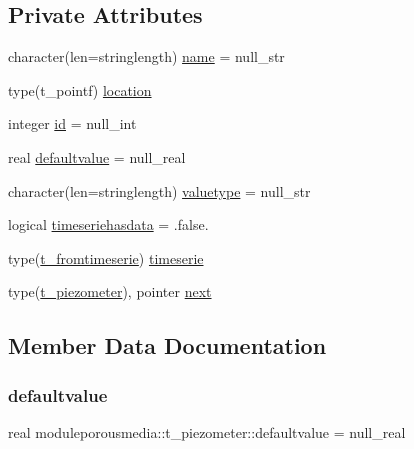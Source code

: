 \subsection*{Private Attributes}
\begin{DoxyCompactItemize}
\item 
character(len=stringlength) \mbox{\hyperlink{structmoduleporousmedia_1_1t__piezometer_a9a875705fadb629f66124c3027d6d73f}{name}} = null\+\_\+str
\item 
type(t\+\_\+pointf) \mbox{\hyperlink{structmoduleporousmedia_1_1t__piezometer_a5ab1e993966e08eebce61931d362c9f5}{location}}
\item 
integer \mbox{\hyperlink{structmoduleporousmedia_1_1t__piezometer_a02df2d8e5985d5684201e8e7e55e32ed}{id}} = null\+\_\+int
\item 
real \mbox{\hyperlink{structmoduleporousmedia_1_1t__piezometer_ae0cc8ffd35dee5988c4b6c575231bb96}{defaultvalue}} = null\+\_\+real
\item 
character(len=stringlength) \mbox{\hyperlink{structmoduleporousmedia_1_1t__piezometer_a5e0c9f72420bddde4b5d641958601ac3}{valuetype}} = null\+\_\+str
\item 
logical \mbox{\hyperlink{structmoduleporousmedia_1_1t__piezometer_a6d812a75d8ae107c0138c147b5183815}{timeseriehasdata}} = .false.
\item 
type(\mbox{\hyperlink{structmoduleporousmedia_1_1t__fromtimeserie}{t\+\_\+fromtimeserie}}) \mbox{\hyperlink{structmoduleporousmedia_1_1t__piezometer_ac183af6102cf7fee5a4625e7dc0865de}{timeserie}}
\item 
type(\mbox{\hyperlink{structmoduleporousmedia_1_1t__piezometer}{t\+\_\+piezometer}}), pointer \mbox{\hyperlink{structmoduleporousmedia_1_1t__piezometer_ab246b6e5f1591363820504645c650a3d}{next}}
\end{DoxyCompactItemize}


\subsection{Member Data Documentation}
\mbox{\label{structmoduleporousmedia_1_1t__piezometer_ae0cc8ffd35dee5988c4b6c575231bb96}} 
\subsubsection{\texorpdfstring{defaultvalue}{defaultvalue}}
{\footnotesize\ttfamily real moduleporousmedia\+::t\+\_\+piezometer\+::defaultvalue = null\+\_\+real\hspace{0.3cm}{\ttfamily [private]}}


